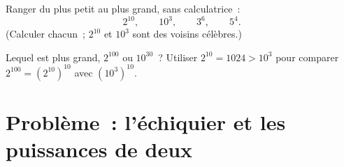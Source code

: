 \begin{exercise}[$\star\star$]\label{exo:g8:powers:10}
Ranger du plus petit au plus grand, sans calculatrice~:
\[
2^{10}, \qquad 10^3, \qquad 3^6, \qquad 5^4 .
\]
(Calculer chacun~; $2^{10}$ et $10^3$ sont des voisins célèbres.)
\end{exercise}

\begin{exercise}[$\star\star\star$]\label{exo:g8:powers:11}
Lequel est plus grand, $2^{100}$ ou $10^{30}$~? Utiliser
$2^{10} = 1024 > 10^3$ pour comparer
$2^{100} = \left(2^{10}\right)^{10}$ avec
$\left(10^3\right)^{10}$.
\end{exercise}

\section{Problème~: l'échiquier et les puissances de deux}

